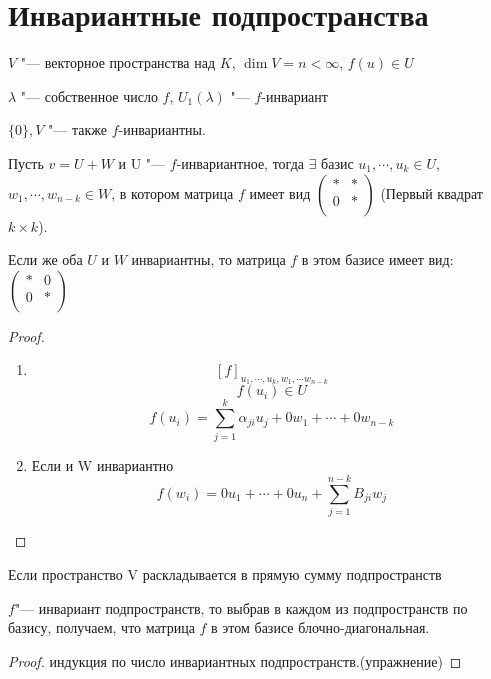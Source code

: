 \section{Инвариантные подпространства}

$V$ "--- векторное пространства над $K$, $\dim V = n < \infty$, $f(u) \in U$

\begin{exmp}
$\lambda$ "--- собственное число $f$, $U_1(\lambda)$ "--- $f$-инвариант

$\{0\}, V$ "--- также $f$-инвариантны. 

\end{exmp} 

\begin{theorem}{}
Пусть $v = U + W$ и U "--- $f$-инвариантное, тогда
$\exists$ базис $u_1, \cdots, u_k \in U$, 
$w_1, \cdots, w_{n - k} \in W$, в котором матрица $f$
имеет вид 
$\begin{pmatrix}
*&*\\
0&*\\
\end{pmatrix}$
(Первый квадрат $k \times k$).

Если же оба $U$ и $W$ инвариантны, то матрица $f$ в этом базисе имеет вид:
$
\begin{pmatrix}
*&0\\
0&*\\
\end{pmatrix}
$
\end{theorem}
\begin{proof}
\begin{enumerate}
    \item
     $$[f]_{u_1, \cdots,u_k, w_1, \cdots w_{n - k}}$$
     $$f(u_i) \in U$$
     $$f(u_i) = \sum_{j = 1}^{k} \alpha_{ji}u_j + 0w_1 + \cdots + 0w_{n - k}$$
     \item Если и W инвариантно
     $$f(w_i) = 0u_1 + \cdots + 0u_n + \sum_{j = 1}^{n - k}B_{ji}w_j$$
\end{enumerate}
\end{proof}
\begin{conseq}
Если пространство V раскладывается в прямую сумму подпространств

$f$"--- инвариант подпространств, то выбрав в каждом из
подпространств по базису, получаем, что матрица $f$ в этом
базисе блочно-диагональная.
\end{conseq}
\begin{proof}
индукция по число инвариантных подпространств.(упражнение)
\end{proof}

